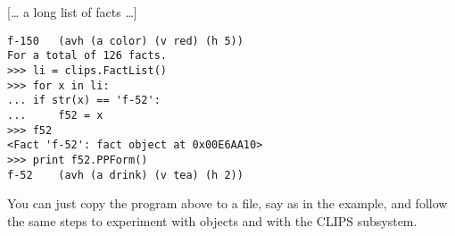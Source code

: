 [\dots{} a long list of facts \dots{}]

\begin{verbatim}
f-150   (avh (a color) (v red) (h 5))
For a total of 126 facts.
>>> li = clips.FactList()
>>> for x in li:
...	if str(x) == 'f-52':
...		f52 = x
>>> f52
<Fact 'f-52': fact object at 0x00E6AA10>
>>> print f52.PPForm()
f-52    (avh (a drink) (v tea) (h 2))
\end{verbatim}

You can just copy the program above to a file, say  as
in the example, and follow the same steps to experiment with \pyclips{}
objects and with the CLIPS subsystem.
